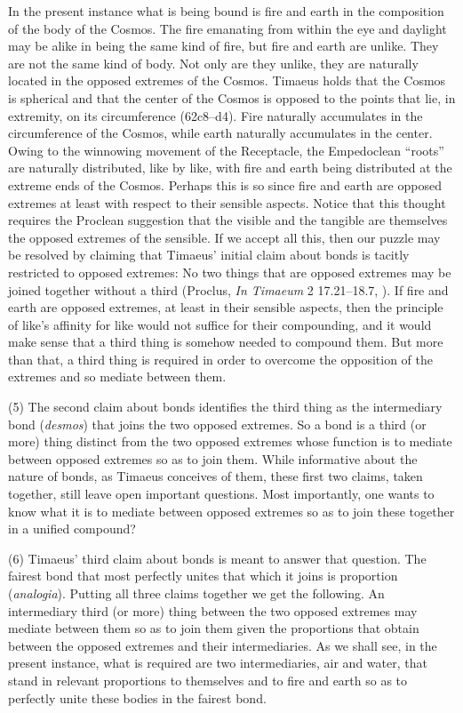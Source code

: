 In the present instance what is being bound is fire and earth in the composition of the body of the Cosmos. The fire emanating from within the eye and daylight may be alike in being the same kind of fire, but fire and earth are unlike. They are not the same kind of body. Not only are they unlike, they are naturally located in the opposed extremes of the Cosmos. Timaeus holds that the Cosmos is spherical and that the center of the Cosmos is opposed to the points that lie, in extremity, on its circumference (62c8–d4). Fire naturally accumulates in the circumference of the Cosmos, while earth naturally accumulates in the center. Owing to the winnowing movement of the Receptacle, the Empedoclean ``roots'' are naturally distributed, like by like, with fire and earth being distributed at the extreme ends of the Cosmos. Perhaps this is so since fire and earth are opposed extremes at least with respect to their sensible aspects. Notice that this thought requires the Proclean suggestion that the visible and the tangible are themselves the opposed extremes of the sensible. If we accept all this, then our puzzle may be resolved by claiming that Timaeus' initial claim about bonds is tacitly restricted to opposed extremes: No two things that are opposed extremes may be joined together without a third (Proclus, \emph{In Timaeum} 2 17.21--18.7, \citealt{Diehl:1903re}). If fire and earth are opposed extremes, at least in their sensible aspects, then the principle of like's affinity for like would not suffice for their compounding, and it would make sense that a third thing is somehow needed to compound them. But more than that, a third thing is required in order to overcome the opposition of the extremes and so mediate between them.

(5) The second claim about bonds identifies the third thing as the intermediary bond (\emph{desmos}) that joins the two opposed extremes. So a bond is a third (or more) thing distinct from the two opposed extremes whose function is to mediate between opposed extremes so as to join them. While informative about the nature of bonds, as Timaeus conceives of them, these first two claims, taken together, still leave open important questions. Most importantly, one wants to know what it is to mediate between opposed extremes so as to join these together in a unified compound? 

(6) Timaeus' third claim about bonds is meant to answer that question. The fairest bond that most perfectly unites that which it joins is proportion (\emph{analogia}). Putting all three claims together we get the following. An intermediary third (or more) thing between the two opposed extremes may mediate between them so as to join them given the proportions that obtain between the opposed extremes and their intermediaries. As we shall see, in the present instance, what is required are two intermediaries, air and water, that stand in relevant proportions to themselves and to fire and earth so as to perfectly unite these bodies in the fairest bond.

